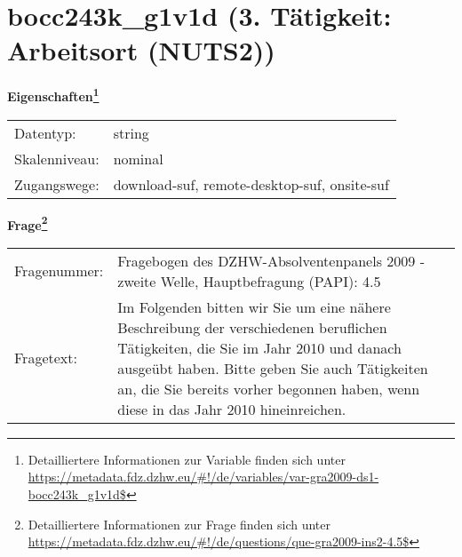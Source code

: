 
    \setcounter{footnote}{0}

    \vspace*{-1.8cm}
	\section{bocc243k\_g1v1d (3. Tätigkeit: Arbeitsort (NUTS2))}
	\label{section:bocc243k_g1v1d}



    \vspace*{0.5cm}
    \noindent\textbf{Eigenschaften\footnote{Detailliertere Informationen zur Variable finden sich unter
		\url{https://metadata.fdz.dzhw.eu/\#!/de/variables/var-gra2009-ds1-bocc243k_g1v1d$}}}\\
	\begin{tabularx}{\hsize}{@{}lX}
	Datentyp: & string \\
	Skalenniveau: & nominal \\
	Zugangswege: &
	  download-suf, 
	  remote-desktop-suf, 
	  onsite-suf
 \\
    \end{tabularx}



				\vspace*{0.5cm}
                \noindent\textbf{Frage\footnote{Detailliertere Informationen zur Frage finden sich unter
		              \url{https://metadata.fdz.dzhw.eu/\#!/de/questions/que-gra2009-ins2-4.5$}}}\\
				\begin{tabularx}{\hsize}{@{}lX}
					Fragenummer: &
					  Fragebogen des DZHW-Absolventenpanels 2009 - zweite Welle, Hauptbefragung (PAPI):
					  4.5
 \\
					Fragetext: & Im Folgenden bitten wir Sie um eine nähere Beschreibung der verschiedenen beruflichen Tätigkeiten, die Sie im Jahr 2010 und danach ausgeübt haben. Bitte geben Sie auch Tätigkeiten an, die Sie bereits vorher begonnen haben, wenn diese in das Jahr 2010 hineinreichen. \\
				\end{tabularx}





